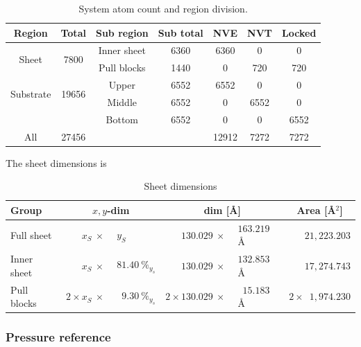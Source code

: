\begin{table}[H]
  \begin{center}
  \caption{System atom count and region division.}
  \label{tab:system_count}
  \begin{tabular}{ |c|| c | c | c | c | c | c |} \hline
    \textbf{Region} & \textbf{Total}  & Sub region & Sub total & \textbf{NVE} &
    \textbf{NVT} & \textbf{Locked} \\ \hline   
    \multirow{2}{*}{Sheet} & \multirow{2}{*}{7800} & Inner sheet & 6360 & 6360 &
    0 & 0 \\ %
    & & Pull blocks & 1440 & 0 & 720 & 720 \\ \hline   
    \multirow{2}{*}{Substrate} & \multirow{2}{*}{19656} & Upper & 6552 & 6552 &
    0 & 0 \\ %
    & & Middle & 6552 & 0 & 6552 & 0 \\ %
    & & Bottom & 6552 & 0 & 0 & 6552 \\ \hline \hline   
    All & 27456 & \multicolumn{2}{r|}{} & 12912 & 7272 & 7272 \\ \hline 
  \end{tabular}
  \end{center}
\end{table}


The sheet dimensions is 
\begin{table}[H]
  \begin{center}
  \caption{Sheet dimensions}
  \label{tab:}
  \begin{tabular}{ | l | r@{}l | r@{}l | c |} \hline
    \textbf{Group} & \multicolumn{2}{c|}{$x,y$-dim} & \multicolumn{2}{c|}{dim
    [Å]} & Area [Å$^2$]\\ \hline
  Full sheet & $x_S \: \times \: $ & $y_S$ &  $130.029 \: \times \:$ & $163.219$
  Å & $\phantom{2\times} 21,223.203$ \\ \hline
  Inner sheet & $x_S \: \times \:$ & $81.40 \ \%_{y_s}$ &  $130.029  \: \times
  \:$ & $132.853$ Å & $\phantom{2\times} 17,274.743$\\ \hline
  Pull blocks & $2 \times x_S \: \times \:$ & $ \phantom{0}9.30 \ \%_{y_s}$ & $2
  \times 130.029  \: \times \: $ & $\phantom{0}15.183$ Å  & $2 \times
  \phantom{0}1,974.230$ \\ \hline  
  \end{tabular}
  \end{center}
\end{table}


\subsubsection{Pressure reference}

